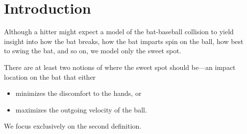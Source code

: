 \tableofcontents
\listoftables
\listoffigures
\newpage
\pagestyle{fancy}
\setcounter{page}{1}

\section{Introduction}

Although a hitter might expect a model of the bat-baseball collision to
yield insight into how the bat breaks, how the bat imparts spin on the ball,
how best to swing the bat, and so on, we model only the sweet spot.

There are at least two notions of where the sweet spot should be—an
impact location on the bat that either
\begin{itemize}
\item minimizes the discomfort to the hands, or
\item maximizes the outgoing velocity of the ball.
\end{itemize}
We focus exclusively on the second definition.

